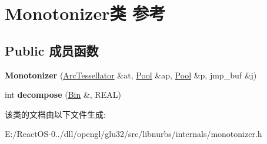 \hypertarget{class_monotonizer}{}\section{Monotonizer类 参考}
\label{class_monotonizer}
\subsection*{Public 成员函数}
\begin{DoxyCompactItemize}
\item 
\mbox{\label{class_monotonizer_aace69e2df48b29cc8007892aa8dd98d6}} 
{\bfseries Monotonizer} (\hyperlink{class_arc_tessellator}{Arc\+Tessellator} \&at, \hyperlink{class_pool}{Pool} \&ap, \hyperlink{class_pool}{Pool} \&p, jmp\+\_\+buf \&j)
\item 
\mbox{\label{class_monotonizer_aaa775e3b7287202f781b1a285cdd9600}} 
int {\bfseries decompose} (\hyperlink{class_bin}{Bin} \&, R\+E\+AL)
\end{DoxyCompactItemize}


该类的文档由以下文件生成\+:\begin{DoxyCompactItemize}
\item 
E\+:/\+React\+O\+S-\/0../dll/opengl/glu32/src/libnurbs/internals/monotonizer.\+h\end{DoxyCompactItemize}
